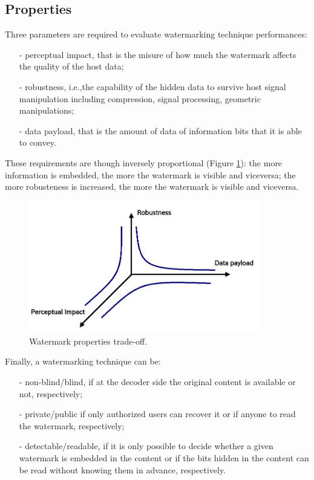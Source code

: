 \subsection{Properties}
Three parameters are required to evaluate watermarking technique performances:
\begin{itemize}
\item[-] perceptual impact, that is the misure of how much the watermark affects the quality of the host data;
\item[-] robustness, i.e.,the capability of the hidden data to survive host signal manipulation including compression, signal processing, geometric manipulations;
\item[-] data payload, that is the amount of data of information bits that it is able to convey.
\end{itemize}
These requirements are though inversely proportional (Figure \ref{fig:properties}): the more information is embedded, the more the watermark is visible and viceversa; the more robusteness is increased, the more the watermark is visible and viceversa.\\
\begin{figure}[h!]
\centering
\includegraphics[width=0.9\textwidth]{./img/properties.jpg}
\caption{\small{Watermark properties trade-off.}}
\label{fig:properties}
\end{figure}
Finally, a watermarking technique can be:
\begin{itemize}
\item[-] non-blind/blind, if at the decoder side the original content is available or not, respectively;
\item[-] private/public if only authorized users
can recover it or if anyone to read the watermark, respectively;
\item[-] detectable/readable, if it is only possible to decide whether a given watermark is embedded in the content or if the bits hidden in the content can be read without knowing them in advance, respectively.
\end{itemize}




